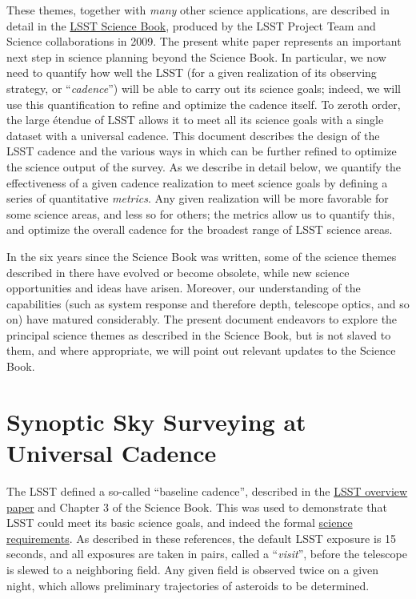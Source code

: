 These themes, together with {\em many} other science applications, are
described in detail in the
\href{http://lsst.org/scientists/scibook}{LSST Science Book}, produced
by the LSST Project Team and Science collaborations in 2009.  The
present white paper represents an important next step in science
planning beyond the Science Book.  In particular, we now need to
quantify how well the LSST (for a given realization of its observing
strategy, or ``{\em cadence}'') will be able to carry out its science
goals; indeed, we will use this quantification to refine and optimize
the cadence itself.  To zeroth order, the large \'etendue of LSST
allows it to meet all its science goals with a single dataset with a
universal cadence.  This document describes the design of the LSST
cadence and the various ways in which can be further refined to
optimize the science output of the survey.  As we describe in detail
below, we quantify the effectiveness of a given cadence realization to
meet science goals by defining a series of quantitative {\em metrics}.
Any given realization will be more favorable for some science areas,
and less so for others; the metrics allow us to quantify this, and
optimize the overall cadence for the broadest range of LSST science
areas.

In the six years since the Science Book was written, some of the
science themes described in there have evolved or become obsolete,
while new science opportunities and ideas have arisen.  Moreover, our
understanding of the capabilities (such as system response and
therefore depth, telescope optics, and so on) have matured
considerably.  The present document endeavors to explore the principal
science themes as described in the Science Book, but is not slaved to
them, and where appropriate, we will point out relevant updates to the
Science Book.




\section{Synoptic Sky Surveying at Universal Cadence}
\def\secname{intro:baseline}\label{sec:\secname}

The LSST defined a so-called ``baseline cadence'', described in the
\href{http://adsabs.harvard.edu/abs/2008arXiv0805.2366I}{LSST overview
paper} and Chapter 3 of the Science Book.  This was used
to demonstrate that LSST could meet its basic science goals, and indeed
the formal
\href{https://www.lsstcorp.org/docushare/dsweb/Get/LPM-17}{science
requirements}.    As described in these references, the default LSST
exposure is 15 seconds, and all exposures are taken in pairs, called a
``{\em visit}'', before the telescope is slewed to a neighboring field.
Any given field is observed twice on a given night, which allows
preliminary trajectories of asteroids to be determined.

